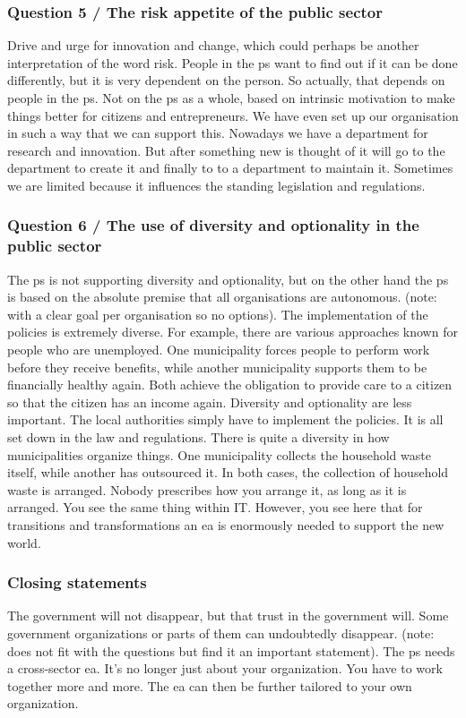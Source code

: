 \subsubsection{Question 5 / The risk appetite of the public sector}
Drive and urge for innovation and change, which could perhaps be another interpretation of the word risk. People in the \gls{ps} want to find out if it can be done differently, but it is very dependent on the person. So actually, that depends on people in the \gls{ps}. Not on the \gls{ps} as a whole, based on intrinsic motivation to make things better for citizens and entrepreneurs. We have even set up our organisation in such a way that we can support this. Nowadays we have a department for research and innovation. But after something new is thought of it will go to the department to create it and finally to to a department to maintain it. Sometimes we are limited because it influences the standing legislation and regulations.
\subsubsection{Question 6 / The use of diversity and optionality in the public sector}
The \gls{ps} is not supporting diversity and optionality, but on the other hand the \gls{ps} is based on the absolute premise that all organisations are autonomous. (note: with a clear goal per organisation so no options). The implementation of the policies is extremely diverse. For example, there are various approaches known for people who are unemployed. One municipality forces people to perform work before they receive benefits, while another municipality supports them to be financially healthy again. Both achieve the obligation to provide care to a citizen so that the citizen has an income again. Diversity and optionality are less important. The local authorities simply have to implement the policies. It is all set down in the law and regulations. There is quite a diversity in how municipalities organize things. One municipality collects the household waste itself, while another has outsourced it. In both cases, the collection of household waste is arranged. Nobody prescribes how you arrange it, as long as it is arranged. You see the same thing within IT. However, you see here that for transitions and transformations an \acrshort{ea} is enormously needed to support the new world.
\subsubsection{Closing statements}
The government will not disappear, but that trust in the government will. Some government organizations or parts of them can undoubtedly disappear. (note: does not fit with the questions but find it an important statement).
The \gls{ps} needs a cross-sector \acrshort{ea}. It's no longer just about your organization. You have to work together more and more. The \acrshort{ea} can then be further tailored to your own organization.
